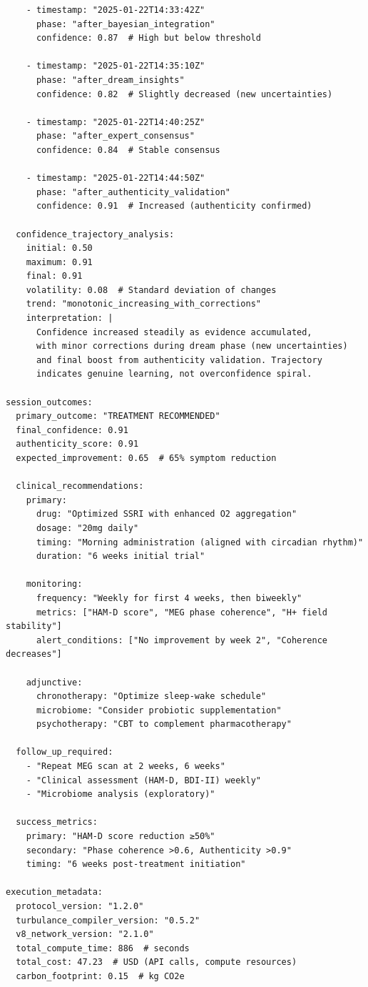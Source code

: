 \begin{verbatim}
    - timestamp: "2025-01-22T14:33:42Z"
      phase: "after_bayesian_integration"
      confidence: 0.87  # High but below threshold
    
    - timestamp: "2025-01-22T14:35:10Z"
      phase: "after_dream_insights"
      confidence: 0.82  # Slightly decreased (new uncertainties)
    
    - timestamp: "2025-01-22T14:40:25Z"
      phase: "after_expert_consensus"
      confidence: 0.84  # Stable consensus
    
    - timestamp: "2025-01-22T14:44:50Z"
      phase: "after_authenticity_validation"
      confidence: 0.91  # Increased (authenticity confirmed)
  
  confidence_trajectory_analysis:
    initial: 0.50
    maximum: 0.91
    final: 0.91
    volatility: 0.08  # Standard deviation of changes
    trend: "monotonic_increasing_with_corrections"
    interpretation: |
      Confidence increased steadily as evidence accumulated,
      with minor corrections during dream phase (new uncertainties)
      and final boost from authenticity validation. Trajectory
      indicates genuine learning, not overconfidence spiral.

session_outcomes:
  primary_outcome: "TREATMENT RECOMMENDED"
  final_confidence: 0.91
  authenticity_score: 0.91
  expected_improvement: 0.65  # 65% symptom reduction
  
  clinical_recommendations:
    primary:
      drug: "Optimized SSRI with enhanced O2 aggregation"
      dosage: "20mg daily"
      timing: "Morning administration (aligned with circadian rhythm)"
      duration: "6 weeks initial trial"
    
    monitoring:
      frequency: "Weekly for first 4 weeks, then biweekly"
      metrics: ["HAM-D score", "MEG phase coherence", "H+ field stability"]
      alert_conditions: ["No improvement by week 2", "Coherence decreases"]
    
    adjunctive:
      chronotherapy: "Optimize sleep-wake schedule"
      microbiome: "Consider probiotic supplementation"
      psychotherapy: "CBT to complement pharmacotherapy"
  
  follow_up_required:
    - "Repeat MEG scan at 2 weeks, 6 weeks"
    - "Clinical assessment (HAM-D, BDI-II) weekly"
    - "Microbiome analysis (exploratory)"
  
  success_metrics:
    primary: "HAM-D score reduction ≥50%"
    secondary: "Phase coherence >0.6, Authenticity >0.9"
    timing: "6 weeks post-treatment initiation"

execution_metadata:
  protocol_version: "1.2.0"
  turbulance_compiler_version: "0.5.2"
  v8_network_version: "2.1.0"
  total_compute_time: 886  # seconds
  total_cost: 47.23  # USD (API calls, compute resources)
  carbon_footprint: 0.15  # kg CO2e
\end{verbatim}

